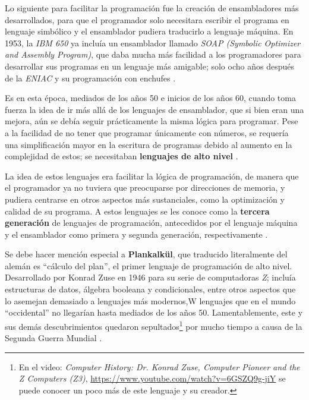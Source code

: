 \documentclass[letterpaper,12pt,oneside]{book}
\begin{document}
		Lo siguiente para facilitar la programación fue la creación de ensambladores más desarrollados, para que el programador solo necesitara
		escribir el programa en lenguaje simbólico y el ensamblador pudiera traducirlo a lenguaje máquina. En 1953, la \textit{IBM 650} ya incluía un ensamblador
		llamado \textit{SOAP (Symbolic Optimizer and Assembly Program)}, que daba mucha más facilidad a los programadores
		para desarrollar sus programas en un lenguaje más amigable; solo ocho años después de la \textit{ENIAC} y su programación con enchufes \cite{salomon_assemblers_1992}.
		
		Es en esta época, mediados de los años 50 e inicios de los años 60, cuando toma fuerza la idea
		de ir más allá de los lenguajes de ensamblador, que si bien eran una mejora, aún se debía seguir prácticamente la misma lógica para programar. Pese a
		la facilidad de no tener que programar únicamente con números, se requería una simplificación mayor en la escritura
		de programas debido al aumento en la complejidad de estos; se necesitaban \textbf{lenguajes de alto nivel}
		\cite{oregan_brief_2012}.
  
        La idea
		de estos lenguajes era facilitar la lógica de programación, de manera que el programador ya no tuviera que preocuparse por direcciones de memoria, y pudiera centrarse
		en otros aspectos más sustanciales, como la optimización y calidad de su programa. A estos lenguajes se les conoce como la \textbf{tercera generación}
		de lenguajes de programación, antecedidos por el lenguaje máquina y el ensamblador como primera y segunda generación, respectivamente \cite{oregan_brief_2012}.
		
		Se debe hacer mención especial a \textbf{Plankalk\"{u}l}, que traducido literalmente del alemán es ``cálculo del plan'', el primer lenguaje de programación de alto 
		nivel. Desarrollado por Konrad Zuse en 1946 para su serie
		de computadoras \textit{Z}; incluía estructuras de datos, álgebra booleana y condicionales, entre otros aspectos que lo asemejan demasiado a lenguajes más modernos,W
		lenguajes que en el mundo ``occidental'' no llegarían hasta mediados de los años 50. Lamentablemente, este y sus demás descubrimientos quedaron sepultados\footnote{En el video: \emph{Computer History: Dr. Konrad Zuse, Computer Pioneer and the Z 
		Computers (Z3)}, \url{https://www.youtube.com/watch?v=6GSZQ9g-jiY} se puede conocer un poco más de este lenguaje y su creador.} por mucho 
		tiempo a causa de la Segunda Guerra Mundial \cite{oregan_brief_2012}.
		
\end{document}
